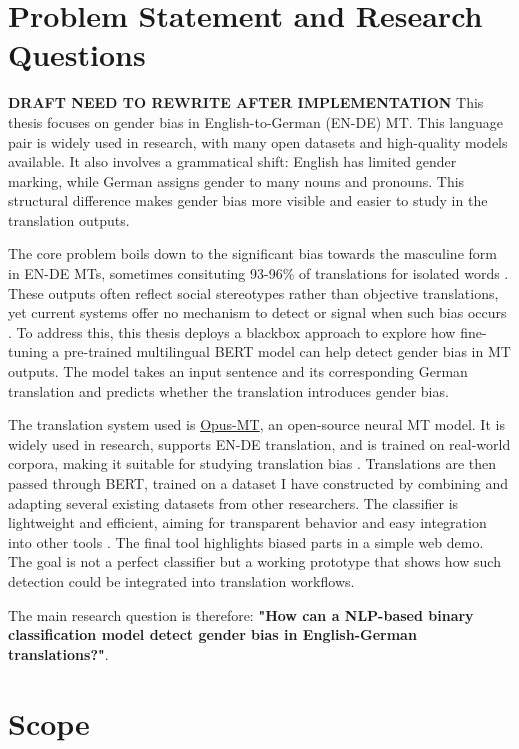\section{Problem Statement and Research Questions}
\textbf{DRAFT NEED TO REWRITE AFTER IMPLEMENTATION}
This thesis focuses on gender bias in English-to-German (EN-DE) MT. This language pair is widely used in research, with many open datasets and high-quality models available. It also involves a grammatical shift: English has limited gender marking, while German assigns gender to many nouns and pronouns. This structural difference makes gender bias more visible and easier to study in the translation outputs.

The core problem boils down to the significant bias towards the masculine form in EN-DE MTs, sometimes consituting 93-96\% of translations for isolated words \parencite{lardelliBuildingBridgesDataset2024}. These outputs often reflect social stereotypes rather than objective translations, yet current systems offer no mechanism to detect or signal when such bias occurs \parencite{rescignoGenderBiasMachine2023}. To address this, this thesis deploys a blackbox approach to explore how fine-tuning a pre-trained multilingual BERT model can help detect gender bias in MT outputs. The model takes an input sentence and its corresponding German translation and predicts whether the translation introduces gender bias. 

The translation system used is \href{https://github.com/Helsinki-NLP/Opus-MT?tab=readme-ov-file}{Opus-MT}, an open-source neural MT model. It is widely used in research, supports EN-DE translation, and is trained on real-world corpora, making it suitable for studying translation bias \parencite{tiedemannOPUSMTBuildingOpen2020}. Translations are then passed through BERT, trained on a dataset I have constructed by combining and adapting several existing datasets from other researchers. The classifier is lightweight and efficient, aiming for transparent behavior and easy integration into other tools \parencite{devlinBERTPretrainingDeep2019}. The final tool highlights biased parts in a simple web demo. The goal is not a perfect classifier but a working prototype that shows how such detection could be integrated into translation workflows.

The main research question is therefore: \textbf{"How can a NLP-based binary classification model detect gender bias in English-German translations?"}. 

\section{Scope}

